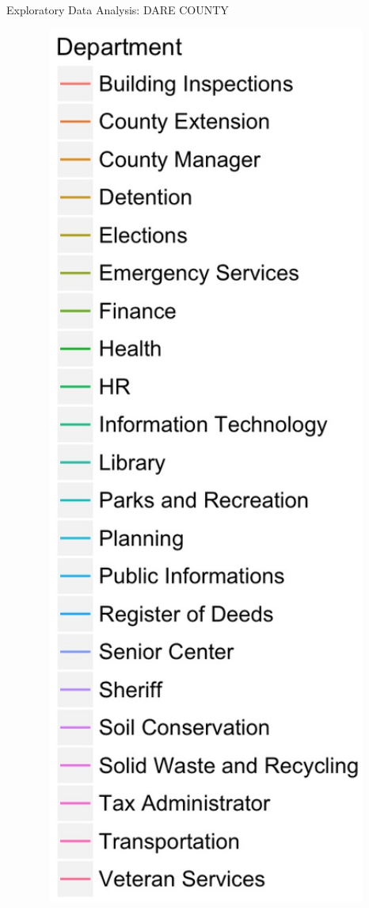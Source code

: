 \documentclass[10pt]{beamer}
\theoremstyle{definition}
\theoremstyle{remark}
\begin{document}
\begin{frame}{Exploratory Data Analysis: DARE COUNTY}
\begin{minipage}{0.13\linewidth}
\begin{figure}
	 		 		 	\includegraphics[width=1.25\textwidth]{figures/Dept2.jpg}
	 \end{figure}	
	\end{minipage}
\end{frame}
\end{document}

